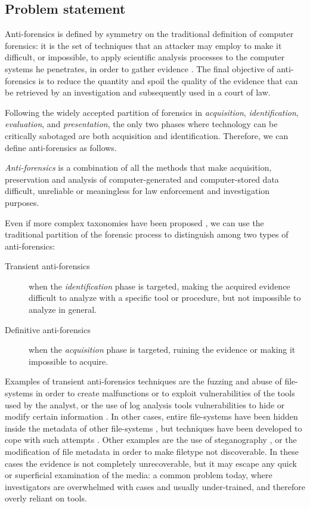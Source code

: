 \subsection{Problem statement}
\label{host:forensics:antifor}
Anti-forensics is defined by symmetry on the traditional definition of computer forensics: it is the set of techniques that an attacker may employ to make it difficult, or impossible, to apply scientific analysis processes to the computer systems he penetrates, in order to gather evidence \citep{garfinkel,berghel,ryan}. The final objective of anti-forensics is to reduce the quantity and spoil the quality \citep{grugq} of the evidence that can be retrieved by an investigation and subsequently used in a court of law.

Following the widely accepted partition of forensics \citep{pollitt} in \emph{acquisition}, \emph{identification}, \emph{evaluation}, and \emph{presentation}, the only two phases where technology can be critically sabotaged are both acquisition and identification. Therefore, we can define anti-forensics as follows.

\begin{definition}
  \emph{Anti-forensics} is a combination of all the methods that make acquisition, preservation and analysis of computer-generated and computer-stored data difficult, unreliable or meaningless for law enforcement and investigation purposes.
\end{definition}

Even if more complex taxonomies have been proposed \citep{ryan}, we can use the traditional partition of the forensic process to distinguish among two types of anti-forensics:

\begin{description}
\item [Transient anti-forensics] when the \emph{identification} phase is targeted, making the acquired evidence difficult to analyze with a specific tool or procedure, but not impossible to analyze in general.
\item [Definitive anti-forensics] when the \emph{acquisition} phase is targeted, ruining the evidence or making it impossible to acquire.
\end{description}

Examples of transient anti-forensics techniques are the fuzzing and abuse of file-systems in order to create malfunctions or to exploit vulnerabilities of the tools used by the analyst, or the use of log analysis tools vulnerabilities to hide or modify certain information \citep{foster,grugq}. In other cases, entire file-systems have been hidden inside the metadata of other file-systems \citep{grugq}, but techniques have been developed to cope with such attempts \citep{det-hidd}. Other examples are the use of steganography \citep{johnson1998ess}, or the modification of file metadata in order to make filetype not discoverable. In these cases the evidence is not completely unrecoverable, but it may escape any quick or superficial examination of the media: a common problem today, where investigators are overwhelmed with cases and usually under-trained, and therefore overly reliant on tools.

